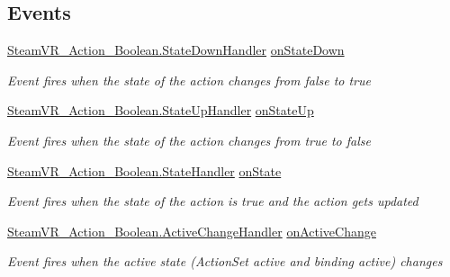 \subsection*{Events}
\begin{DoxyCompactItemize}
\item 
\mbox{\hyperlink{class_valve_1_1_v_r_1_1_steam_v_r___action___boolean_a529f46e4f0459edb2641bbb382d10614}{Steam\+V\+R\+\_\+\+Action\+\_\+\+Boolean.\+State\+Down\+Handler}} \mbox{\hyperlink{class_valve_1_1_v_r_1_1_steam_v_r___action___boolean___source_a047594426551baeff37ca81d6751ad69}{on\+State\+Down}}
\begin{DoxyCompactList}\small\item\em Event fires when the state of the action changes from false to true \end{DoxyCompactList}\item 
\mbox{\hyperlink{class_valve_1_1_v_r_1_1_steam_v_r___action___boolean_a87ebada25dac6016557c3b81e6324b90}{Steam\+V\+R\+\_\+\+Action\+\_\+\+Boolean.\+State\+Up\+Handler}} \mbox{\hyperlink{class_valve_1_1_v_r_1_1_steam_v_r___action___boolean___source_a1b52d5a2bfc5a5f364cd97827b2dd1dc}{on\+State\+Up}}
\begin{DoxyCompactList}\small\item\em Event fires when the state of the action changes from true to false \end{DoxyCompactList}\item 
\mbox{\hyperlink{class_valve_1_1_v_r_1_1_steam_v_r___action___boolean_a59bb3ba4454fcebc2f1d2ddd661dd38f}{Steam\+V\+R\+\_\+\+Action\+\_\+\+Boolean.\+State\+Handler}} \mbox{\hyperlink{class_valve_1_1_v_r_1_1_steam_v_r___action___boolean___source_a90421a54054f0660a28d0d6703bdbc7e}{on\+State}}
\begin{DoxyCompactList}\small\item\em Event fires when the state of the action is true and the action gets updated \end{DoxyCompactList}\item 
\mbox{\hyperlink{class_valve_1_1_v_r_1_1_steam_v_r___action___boolean_af9f3044d5e4868485945b70d907c6bbb}{Steam\+V\+R\+\_\+\+Action\+\_\+\+Boolean.\+Active\+Change\+Handler}} \mbox{\hyperlink{class_valve_1_1_v_r_1_1_steam_v_r___action___boolean___source_a89f4c615f6cc510d0bf7326218d85759}{on\+Active\+Change}}
\begin{DoxyCompactList}\small\item\em Event fires when the active state (Action\+Set active and binding active) changes \end{DoxyCompactList}\item 

\end{DoxyCompactItemize}

